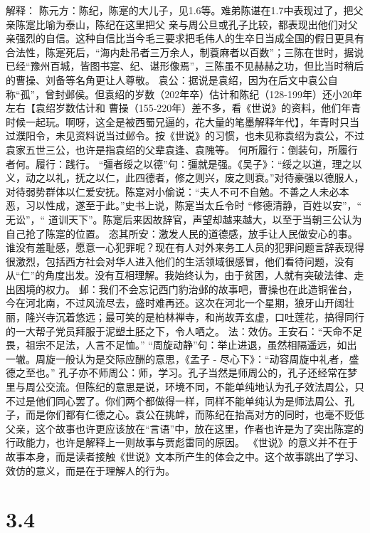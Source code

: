 \documentclass[]{book}
\begin{document}
解释：
陈元方：陈纪，陈寔的大儿子，见1.6等。难弟陈谌在1.7中表现过了，把父亲陈寔比喻为泰山，陈纪在这里把父
亲与周公旦或孔子比较，都表现出他们对父亲强烈的自信。这种自信比当今毛三要求把毛伟人的生卒日当成全国的假日更具有合法性，陈寔死后，``海内赴吊者三万余人，制蓑麻者以百数''；三陈在世时，据说已经``豫州百城，皆图书寔、纪、谌形像焉''，三陈虽不见赫赫之功，但比当时稍后的曹操、刘备等名角更让人尊敬。
袁公：据说是袁绍，因为在后文中袁公自称``孤''，曾封邺侯。但袁绍的岁数（202年卒）估计和陈纪（128-199年）还小20年左右【袁绍岁数估计和
曹操（155-220年）差不多，看《世说》的资料，他们年青时候一起玩。啊呀，这全是被西蜀兄逼的，花大量的笔墨解释年代】，年青时只当过濮阳令，未见资料说当过邺令。按《世说》的习惯，也未见称袁绍为袁公，不过袁家五世三公，也许是指袁绍的父辈袁逢、袁隗等。
何所履行：倒装句，所履行者何。履行：践行。
``彊者绥之以德''句：彊就是强。《吴子》：``绥之以道，理之以义，动之以礼，抚之以仁，此四德者，修之则兴，废之则衰。''对待豪强以德服人，对待弱势群体以仁爱安抚。陈寔对小偷说：``夫人不可不自勉。不善之人未必本恶，习以性成，遂至于此。''史书上说，陈寔当太丘令时
``修德清静，百姓以安''，`` 无讼''，``
道训天下''。陈寔后来因故辞官，声望却越来越大，以至于当朝三公认为自己抢了陈寔的位置。
恣其所安：激发人民的道德感，放手让人民做安心的事。谁没有羞耻感，愿意一心犯罪呢？现在有人对外来务工人员的犯罪问题言辞表现得很激烈，包括西方社会对华人进入他们的生活领域很感冒，他们看待问题，没有从``仁''的角度出发。没有互相理解。我始终认为，由于贫困，人就有突破法律、走出困境的权力。
邺：我们不会忘记西门豹治邺的故事吧，曹操也在此造铜雀台，今在河北南，不过风流尽去，盛时难再还。这次在河北一个星期，狼牙山开阔壮丽，隆兴寺沉着悠远；最可笑的是柏林禅寺，和尚故弄玄虚，口吐莲花，搞得同行的一大帮子党员拜服于泥塑土胚之下，令人哂之。
法：效仿。王安石：``天命不足畏，祖宗不足法，人言不足恤。''
``周旋动静''句：举止进退，虽然相隔遥远，如出一辙。周旋一般认为是交际应酬的意思，《孟子
- 尽心下》：``动容周旋中礼者，盛德之至也。''
孔子亦不师周公：师，学习。孔子当然是师周公的，孔子还经常在梦里与周公交流。但陈纪的意思是说，环境不同，不能单纯地认为孔子效法周公，只不过是他们同心罢了。你们两个都做得一样，同样不能单纯认为是师法周公、孔子，而是你们都有仁德之心。袁公在挑衅，而陈纪在抬高对方的同时，也毫不贬低父亲，这个故事也许更应该放在``言语''中，放在这里，作者也许是为了突出陈寔的行政能力，也许是解释上一则故事与贾彪雷同的原因。
《世说》的意义并不在于故事本身，而是读者接触《世说》文本所产生的体会之中。这个故事跳出了学习、效仿的意义，而是在于理解人的行为。

\section{3.4}\label{section-158}
\end{document}
